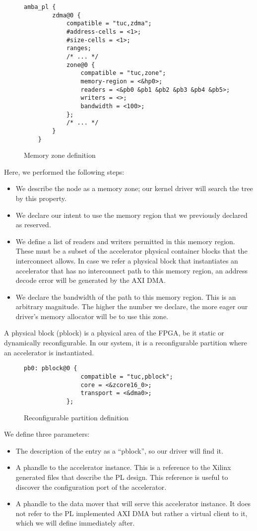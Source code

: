 \begin{figure}[ht!]
\centering
\begin{lstlisting}[style=basic]
	amba_pl {
		zdma@0 {
			compatible = "tuc,zdma";
			#address-cells = <1>;
			#size-cells = <1>;
			ranges;
			/* ... */
			zone@0 {
				compatible = "tuc,zone";
				memory-region = <&hp0>;
				readers = <&pb0 &pb1 &pb2 &pb3 &pb4 &pb5>;
				writers = <>;
				bandwidth = <100>;
			};
			/* ... */
		}
	}
\end{lstlisting}
\caption{Memory zone definition}
\label{list:memzone}
\end{figure}

Here, we performed the following steps:

\begin{itemize}
\item	We describe the node as a memory zone; our kernel driver will search the tree by this property.
\item	We declare our intent to use the memory region that we previously declared as reserved.
\item	We define a list of readers and writers permitted in this memory region. 
	These must be a subset of the accelerator physical container blocks that the interconnect allows.
	In case we refer a physical block that instantiates an accelerator that has no interconnect
	path to this memory region, an address decode error will be generated by the AXI DMA.
\item	We declare the bandwidth of the path to this memory region. 
	This is an arbitrary magnitude. The higher the number we declare, 
	the more eager our driver's memory allocator will be to use this zone.
\end{itemize}

A physical block (pblock) is a physical area of the FPGA, be it static or dynamically reconfigurable.
In our system, it is a reconfigurable partition where an accelerator is instantiated.

\begin{figure}[ht!]
\centering
\begin{lstlisting}[style=basic]
		pb0: pblock@0 {
				compatible = "tuc,pblock";
				core = <&zcore16_0>;
				transport = <&dma0>;
			};
\end{lstlisting}
\caption{Reconfigurable partition definition}
\label{list:pblock}
\end{figure}

We define three parameters:
\begin{itemize}
\item	The description of the entry as a ``pblock'', so our driver will find it.
\item	A phandle to the accelerator instance.  This is a reference to the Xilinx generated files
	that describe the PL design. This reference is useful to discover the configuration port
	of the accelerator.
\item	A phandle to the data mover that will serve this accelerator instance. It does not refer
	to the PL implemented AXI DMA but rather a virtual client to it, 
	which we will define immediately after.
\end{itemize}


